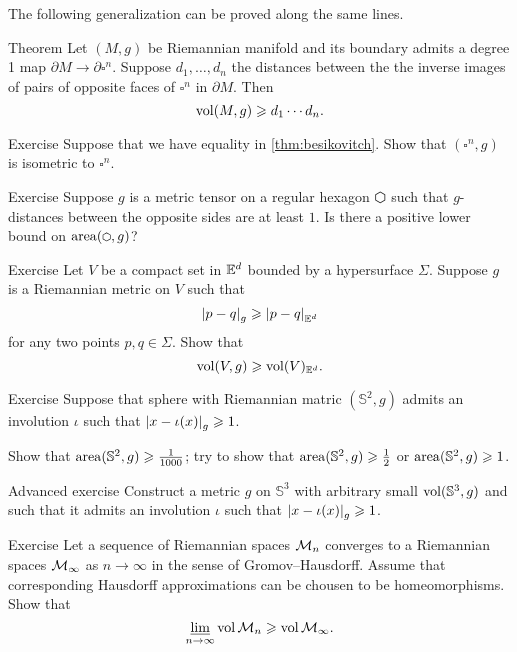 The following generalization can be proved along the same lines.

\begin{thm}{Theorem}\label{thm:besikovitch+}
Let $(M,g)$ be Riemannian manifold and its boundary admits a degree 1 map $\partial M\to\partial\square^n$. 
Suppose $d_1,\dots, d_n$ the distances between the the inverse images of pairs of opposite faces of $\square^n$ in $\partial M$.
Then 
\[\operatorname{\rm vol}\nolimits(M,g)\geqslant d_1\cdots d_n.\]
\end{thm}

\begin{thm}{Exercise}\label{ex:besikovitch=}
Suppose that we have equality in \ref{thm:besikovitch}.
Show that $(\square^n,g)$ is isometric to $\square^n$.
\end{thm}

\begin{thm}{Exercise}\label{ex:hexagon}
Suppose $g$ is a metric tensor on a regular hexagon $\varhexagon
   $ such that $g$-distances between the opposite sides are at least $1$.
Is there a positive lower bound on $\area(\varhexagon,g)$?
\end{thm}

\begin{thm}{Exercise}\label{ex:gadograph}
Let $V$ be a compact set in $\mathbb{E}^d$ bounded by a hypersurface $\Sigma$.
Suppose $g$ is a Riemannian metric on $V$ such that 
\[\dist{p}{q}{g}\ge\dist{p}{q}{\EE^d}\]
for any two points $p,q\in \Sigma$.
Show that
\[\operatorname{\rm vol}\nolimits(V,g)\geqslant \operatorname{\rm vol}\nolimits(V)_{\mathbb{E}^d}.\]
 
\end{thm}

\begin{thm}{Exercise}\label{ex:involution-of-sphere}
Suppose that sphere with Riemannian matric $(\mathbb{S}^2,g)$ admits an involution $\iota$ such that $\dist{x}{\iota(x)}{g}\ge 1$.

Show that $\operatorname{\rm area}\nolimits(\mathbb{S}^2,g)\geqslant \tfrac1{1000}$;
try to show that $\operatorname{\rm area}\nolimits(\mathbb{S}^2,g)\geqslant \tfrac12$ or $\operatorname{\rm area}\nolimits(\mathbb{S}^2,g)\geqslant 1$.
\end{thm}

\begin{thm}{Advanced exercise}\label{ex:involution-of-3sphere}
Construct a metric $g$ on $\mathbb{S}^3$ with arbitrary small $\operatorname{\rm vol}\nolimits(\mathbb{S}^3,g)$ and such that it admits an involution $\iota$ such that $\dist{x}{\iota(x)}{g}\ge 1$.
\end{thm}

\begin{thm}{Exercise}\label{ex:GH-vol}
Let a sequence of Riemannian spaces $\mathcal{M}_n$ converges to a Riemannian spaces $\mathcal{M}_\infty$ as $n\to\infty$ in the sense of Gromov--Hausdorff.
Assume that corresponding Hausdorff approximations can be chousen to be homeomorphisms.
Show that 
\[\varliminf_{n\to\infty}\operatorname{\rm vol}\nolimits\mathcal{M}_n\geqslant \operatorname{\rm vol}\nolimits\mathcal{M}_\infty.\]

\end{thm}



